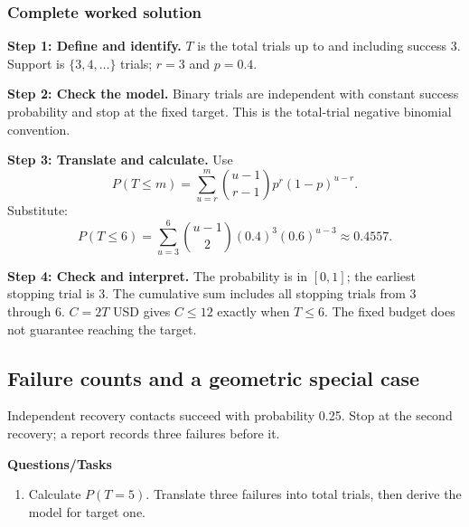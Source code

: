 \subsubsection*{Complete worked solution}
\par\noindent\begin{minipage}{\linewidth}
\textbf{Step 1: Define and identify.} $T$ is the total trials up to and including success 3. Support is $\{3,4,\ldots\}$ trials; $r=3$ and $p=0.4$.
\end{minipage}\par\medskip
\par\noindent\begin{minipage}{\linewidth}
\textbf{Step 2: Check the model.} Binary trials are independent with constant success probability and stop at the fixed target. This is the total-trial negative binomial convention.
\end{minipage}\par\medskip
\par\noindent\begin{minipage}{\linewidth}
\textbf{Step 3: Translate and calculate.} Use
\[P(T\leq m)=\sum_{u=r}^{m}\binom{u-1}{r-1}p^r(1-p)^{u-r}.\]
Substitute:
\[P(T\leq6)=\sum_{u=3}^{6}\binom{u-1}{2}(0.4)^3(0.6)^{u-3}\approx 0.4557.\]
\end{minipage}\par\medskip
\par\noindent\begin{minipage}{\linewidth}
\textbf{Step 4: Check and interpret.} The probability is in $[0,1]$; the earliest stopping trial is 3. The cumulative sum includes all stopping trials from 3 through 6. $C=2T$ USD gives $C\leq12$ exactly when $T\leq6$. The fixed budget does not guarantee reaching the target.
\end{minipage}\par\medskip
{}
\subsection{Failure counts and a geometric special case}
Independent recovery contacts succeed with probability 0.25. Stop at the second recovery; a report records three failures before it.

\textbf{Questions/Tasks}
\begin{enumerate}
\item Calculate $P(T=5)$. Translate three failures into total trials, then derive the model for target one.
\end{enumerate}
